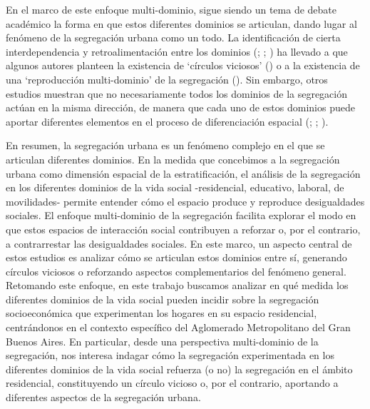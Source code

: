 \documentclass[
  spanish,
  a4paper,%
  chapterprefix=true,%
  DIV=calc,%
  twoside]{scrbook}%
\begin{document}
En el marco de este enfoque multi-dominio, sigue siendo un tema de
debate académico la forma en que estos diferentes dominios se articulan,
dando lugar al fenómeno de la segregación urbana como un todo. La
identificación de cierta interdependencia y retroalimentación entre los
dominios (; ; ) ha llevado a que
algunos autores planteen la existencia de `círculos viciosos'
() o a la existencia de una `reproducción multi-dominio' de
la segregación (). Sin embargo, otros estudios muestran que
no necesariamente todos los dominios de la segregación actúan en la
misma dirección, de manera que cada uno de estos dominios puede aportar
diferentes elementos en el proceso de diferenciación espacial
(; ; ).

En resumen, la segregación urbana es un fenómeno complejo en el que se
articulan diferentes dominios. En la medida que concebimos a la
segregación urbana como dimensión espacial de la estratificación, el
análisis de la segregación en los diferentes dominios de la vida social
-residencial, educativo, laboral, de movilidades- permite entender cómo
el espacio produce y reproduce desigualdades sociales. El enfoque
multi-dominio de la segregación facilita explorar el modo en que estos
espacios de interacción social contribuyen a reforzar o, por el
contrario, a contrarrestar las desigualdades sociales. En este marco, un
aspecto central de estos estudios es analizar cómo se articulan estos
dominios entre sí, generando círculos viciosos o reforzando aspectos
complementarios del fenómeno general. Retomando este enfoque, en este
trabajo buscamos analizar en qué medida los diferentes dominios de la
vida social pueden incidir sobre la segregación socioeconómica que
experimentan los hogares en su espacio residencial, centrándonos en el
contexto específico del Aglomerado Metropolitano del Gran Buenos Aires.
En particular, desde una perspectiva multi-dominio de la segregación,
nos interesa indagar cómo la segregación experimentada en los diferentes
dominios de la vida social refuerza (o no) la segregación en el ámbito
residencial, constituyendo un círculo vicioso o, por el contrario,
aportando a diferentes aspectos de la segregación urbana.
\end{document}
